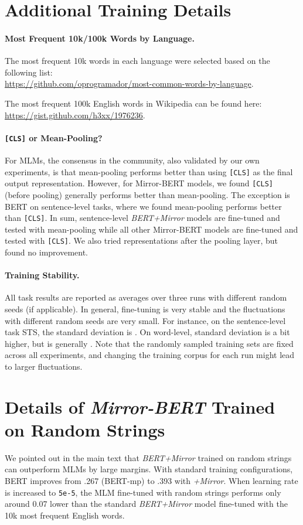 \documentclass[11pt]{article}
\begin{document}
\section{Additional Training Details}
\paragraph{Most Frequent 10k/100k Words by Language.} The most frequent 10k words in each language were selected based on the following list: \\ \url{https://github.com/oprogramador/most-common-words-by-language}. 

\vspace{1.2mm}
\noindent The most frequent 100k English words in Wikipedia can be found here: \\
\url{https://gist.github.com/h3xx/1976236}.


\paragraph{\texttt{[CLS]} or Mean-Pooling?} For MLMs, the consensus in the community, also validated by our own experiments, is that mean-pooling performs better than using \texttt{[CLS]} as the final output representation. However, for Mirror-BERT models, we found \texttt{[CLS]} (before pooling) generally performs better than mean-pooling. The exception is BERT on sentence-level tasks, where we found mean-pooling performs better than \texttt{[CLS]}. In sum, sentence-level \textit{BERT+Mirror} models are fine-tuned and tested with mean-pooling while all other Mirror-BERT models are fine-tuned and tested with \texttt{[CLS]}. We also tried representations after the pooling layer, but found no improvement.

\paragraph{Training Stability.} All task results are reported as averages over three runs with different random seeds (if applicable). In general, fine-tuning is very stable and the fluctuations with different random seeds are very small. For instance, on the sentence-level task STS, the standard deviation is . On word-level, standard deviation is a bit higher, but is generally . Note that the randomly sampled training sets are fixed across all experiments, and changing the training corpus for each run might lead to larger fluctuations. 

\section{Details of \textit{Mirror-BERT} Trained on Random Strings}
We pointed out in the main text that \textit{BERT+Mirror} trained on random strings can outperform MLMs by large margins. 
With standard training configurations, BERT improves from .267 (BERT-mp) to .393 with \textit{+Mirror}. When learning rate is increased to \texttt{5e-5}, the MLM fine-tuned with random strings performs only around 0.07 lower than the standard \textit{BERT+Mirror} model fine-tuned with the 10k most frequent English words.
\end{document}
